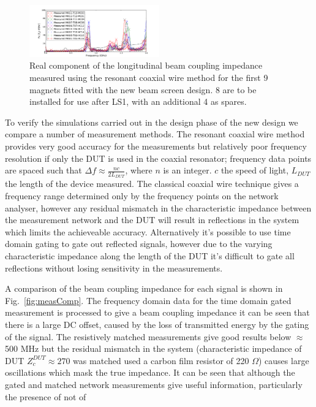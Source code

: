 \documentclass[a4paper,
              ]{jacow}
\begin{document}
\begin{figure}
\includegraphics[width=0.5\textwidth]{mkiNewDesignAll.pdf}
\caption{Real component of the longitudinal beam coupling impedance measured using the resonant coaxial wire method for the first 9 magnets fitted with the new beam screen design. 8 are to be installed for use after LS1, with an additional 4 as spares.}
\label{fig:allNewMKIImp}
\end{figure}

To verify the simulations carried out in the design phase of the new design we compare a number of measurement methods. The resonant coaxial wire method provides very good accuracy for the measurements but relatively poor frequency resolution if only the DUT is used in the coaxial resonator; frequency data points are spaced such that $\Delta f \approx \frac{nc}{2L_{DUT}}$, where $n$ is an integer. $c$ the speed of light, $L_{DUT}$ the length of the device measured. The classical coaxial wire technique gives a frequency range determined only by the frequency points on the network analyser, however any residual mismatch in the characteristic impedance between the measurement network and the DUT will result in reflections in the system which limits the achieveable accuracy. Alternatively it's possible to use time domain gating to gate out reflected signals, however due to the varying characteristic impedance along the length of the DUT it's difficult to gate all reflections without losing sensitivity in the measurements.

A comparison of the beam coupling impedance for each signal is shown in Fig.~\ref{fig:measComp}. The frequency domain data for the time domain gated measurement is processed to give a beam coupling impedance it can be seen that there is a large DC offset, caused by the loss of transmitted energy by the gating of the signal. The resistively matched measurements give good results below $\approx$ 500 MHz but the residual mismatch in the system (characteristic impedance of DUT $Z_{c}^{DUT}\approx 270$ was matched used a carbon film resistor of 220 $\Omega$) causes large oscillations which mask the true impedance. It can be seen that although the gated and matched network measurements give useful information, particularly the presence of not of  
\end{document}
